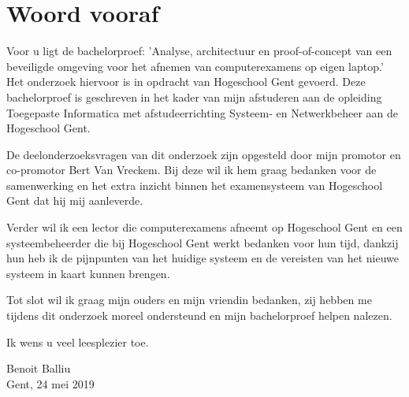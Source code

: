 
\chapter*{Woord vooraf}
\label{ch:voorwoord}


Voor u ligt de bachelorproef: 'Analyse, architectuur en proof-of-concept van een beveiligde omgeving voor het afnemen van computerexamens op eigen laptop.' Het onderzoek hiervoor is in opdracht van Hogeschool Gent gevoerd. Deze bachelorproef is geschreven in het kader van mijn afstuderen aan de opleiding Toegepaste Informatica met afstudeerrichting Systeem- en Netwerkbeheer aan de Hogeschool Gent.

De deelonderzoeksvragen van dit onderzoek zijn opgesteld door mijn promotor en co-promotor Bert Van Vreckem. Bij deze wil ik hem graag bedanken voor de samenwerking en het extra inzicht binnen het examensysteem van Hogeschool Gent dat hij mij aanleverde. 

Verder wil ik een lector die computerexamens afneemt op Hogeschool Gent en een systeembeheerder die bij Hogeschool Gent werkt bedanken voor hun tijd, dankzij hun heb ik de pijnpunten van het huidige systeem en de vereisten van het nieuwe systeem in kaart kunnen brengen.

Tot slot wil ik graag mijn ouders en mijn vriendin bedanken, zij hebben me tijdens dit onderzoek moreel ondersteund en mijn bachelorproef helpen nalezen.

Ik wens u veel leesplezier toe.

Benoit Balliu \\
Gent, 24 mei 2019 